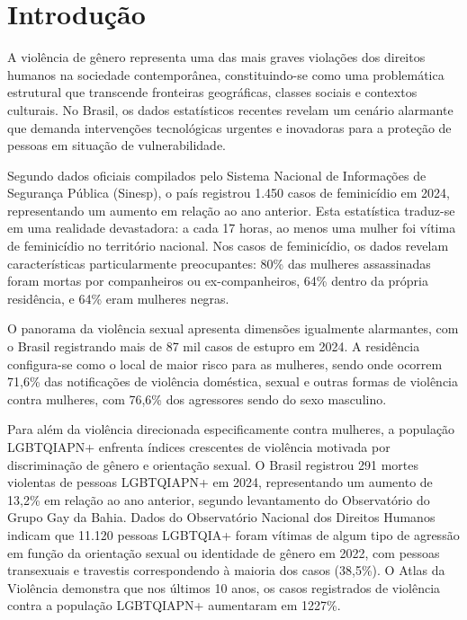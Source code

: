 \chapter{Introdução}\label{sec:introducao}
A violência de gênero representa uma das mais graves violações dos direitos humanos na sociedade contemporânea, constituindo-se como uma problemática estrutural que transcende fronteiras geográficas, classes sociais e contextos culturais. No Brasil, os dados estatísticos recentes revelam um cenário alarmante que demanda intervenções tecnológicas urgentes e inovadoras para a proteção de pessoas em situação de vulnerabilidade.

Segundo dados oficiais compilados pelo Sistema Nacional de Informações de Segurança Pública (Sinesp), o país registrou 1.450 casos de feminicídio em 2024, representando um aumento em relação ao ano anterior\cite{sinesp2024feminicidio}. Esta estatística traduz-se em uma realidade devastadora: a cada 17 horas, ao menos uma mulher foi vítima de feminicídio no território nacional. Nos casos de feminicídio, os dados revelam características particularmente preocupantes: 80\% das mulheres assassinadas foram mortas por companheiros ou ex-companheiros, 64\% dentro da própria residência, e 64\% eram mulheres negras.

O panorama da violência sexual apresenta dimensões igualmente alarmantes, com o Brasil registrando mais de 87 mil casos de estupro em 2024. A residência configura-se como o local de maior risco para as mulheres, sendo onde ocorrem 71,6\% das notificações de violência doméstica, sexual e outras formas de violência contra mulheres, com 76,6\% dos agressores sendo do sexo masculino.

Para além da violência direcionada especificamente contra mulheres, a população LGBTQIAPN+ enfrenta índices crescentes de violência motivada por discriminação de gênero e orientação sexual. O Brasil registrou 291 mortes violentas de pessoas LGBTQIAPN+ em 2024, representando um aumento de 13,2\% em relação ao ano anterior, segundo levantamento do Observatório do Grupo Gay da Bahia\cite{grupogay2024bahia}. Dados do Observatório Nacional dos Direitos Humanos indicam que 11.120 pessoas LGBTQIA+ foram vítimas de algum tipo de agressão em função da orientação sexual ou identidade de gênero em 2022, com pessoas transexuais e travestis correspondendo à maioria dos casos (38,5\%). O Atlas da Violência demonstra que nos últimos 10 anos, os casos registrados de violência contra a população LGBTQIAPN+ aumentaram em 1227\%\cite{observaDH2024}.


